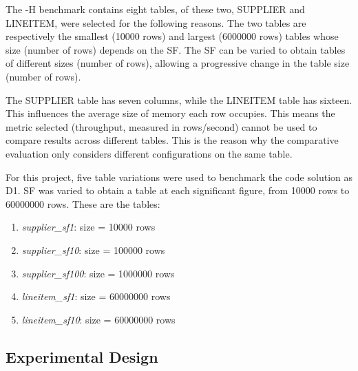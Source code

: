 The -H benchmark contains eight tables, of these two, SUPPLIER and LINEITEM, were selected for the following reasons. The two tables are respectively the smallest (10000 rows) and largest (6000000 rows) tables whose size (number of rows) depends on the \gls{SF}. The \gls{SF} can be varied to obtain tables of different sizes (number of rows), allowing a progressive change in the table size (number of rows). 

The SUPPLIER table has seven columns, while the LINEITEM table has sixteen. This influences the average size of memory each row occupies. This means the metric selected (throughput, measured in rows/second) cannot be used to compare results across different tables. This is the reason why the comparative evaluation only considers different configurations on the same table. 

For this project, five table variations were used to benchmark the code solution as D1. \gls{SF} was varied to obtain a table at each significant figure, from 10000 rows to 60000000 rows. These are the tables:
\begin{enumerate}
    \item \textit{supplier\_sf1}: size = 10000 rows
    \item \textit{supplier\_sf10}: size = 100000 rows
    \item \textit{supplier\_sf100}: size = 1000000 rows
    \item \textit{lineitem\_sf1}: size = 60000000 rows
    \item \textit{lineitem\_sf10}: size = 60000000 rows
\end{enumerate}

\subsection{Experimental Design}
\label{subsec:experimental_design}
%

